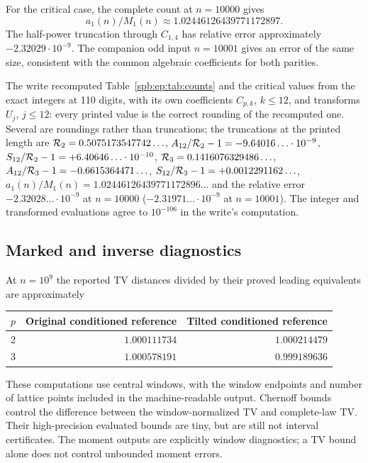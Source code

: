 For the critical case, the complete count at $n=10000$ gives
\[
 a_1(n)/M_1(n)\approx1.02446126439771172897.
\]
The half-power truncation through $C_{1,4}$ has relative error
approximately $-2.32029\cdot10^{-9}$.
The companion odd input $n=10001$ gives an error of the same size,
consistent with the common algebraic coefficients for both parities.
\begin{writenote}
The write recomputed Table~\ref{spb:ep:tab:counts} and the critical values
from the exact integers at 110 digits, with its own coefficients
$C_{p,k}$, $k\le12$, and transforms $U_j$, $j\le12$: every printed value is
the correct rounding of the recomputed one. Several are roundings rather than
truncations; the truncations at the printed length are $\mathcal R_2=0.5075173547742\ldots$,
$A_{12}/\mathcal R_2-1=-9.64016\ldots\cdot10^{-9}$,
$S_{12}/\mathcal R_2-1=+6.40646\ldots\cdot10^{-10}$,
$\mathcal R_3=0.1416076329486\ldots$, $A_{12}/\mathcal R_3-1=-0.6615364471\ldots$,
$S_{12}/\mathcal R_3-1=+0.0012291162\ldots$, $a_1(n)/M_1(n)=1.02446126439771172896\ldots$
and the relative error $-2.32028\ldots\cdot10^{-9}$ at $n=10000$
($-2.31971\ldots\cdot10^{-9}$ at $n=10001$). The integer and transformed
evaluations agree to $10^{-106}$ in the write's computation.
\end{writenote}

\subsection{Marked and inverse diagnostics}
At $n=10^9$ the reported TV distances divided by their proved leading
equivalents are approximately
\begin{center}
\begin{tabular}{@{}crr@{}}
\toprule
$p$ & Original conditioned reference & Tilted conditioned reference\\
\midrule
2 & $1.000111734$ & $1.000214479$\\
3 & $1.000578191$ & $0.999189636$\\
\bottomrule
\end{tabular}
\end{center}
These computations use central windows, with the window endpoints and
number of lattice points included in the machine-readable output.
Chernoff bounds control the difference between the window-normalized TV
and complete-law TV. Their high-precision evaluated bounds are tiny, but
are still not interval certificates. The moment outputs are explicitly
window diagnostics; a TV bound alone does not control unbounded moment
errors.

